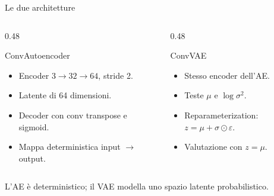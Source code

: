 \documentclass[aspectratio=169,t]{beamer}
\begin{document}
\begin{frame}{Le due architetture}
  \begin{columns}[T,onlytextwidth]
    \begin{column}{0.48\textwidth}
      \begin{block}{ConvAutoencoder}
        \begin{itemize}\small\setlength{\itemsep}{0.12em}
          \item Encoder $3\to32\to64$, stride 2.
          \item Latente di 64 dimensioni.
          \item Decoder con conv transpose e sigmoid.
          \item Mappa deterministica input $\to$ output.
        \end{itemize}
      \end{block}
    \end{column}
    \begin{column}{0.48\textwidth}
      \begin{block}{ConvVAE}
        \begin{itemize}\small\setlength{\itemsep}{0.12em}
          \item Stesso encoder dell'AE.
          \item Teste $\mu$ e $\log\sigma^2$.
          \item Reparameterization: $z=\mu+\sigma\odot\varepsilon$.
          \item Valutazione con $z=\mu$.
        \end{itemize}
      \end{block}
    \end{column}
  \end{columns}

  \vspace{0.22cm}
  \noindent{}

  \vspace{0.22cm}
  {\small\color{muted}L'AE è deterministico; il VAE modella uno spazio latente probabilistico.}
\end{frame}
\end{document}
